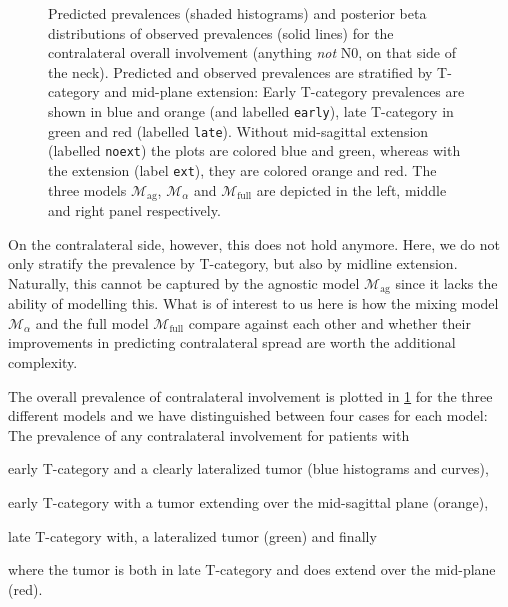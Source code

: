 \documentclass[\relativeRoot/main.tex]{subfiles}
\begin{document}
\begin{figure}
    \def\svgwidth{1.0\textwidth}
    
    \caption[
        Comparison of contralateral prevalences
    ]{
        Predicted prevalences (shaded histograms) and posterior beta distributions of observed prevalences (solid lines) for the contralateral overall involvement (anything \emph{not} N0, on that side of the neck). Predicted and observed prevalences are stratified by T-category and mid-plane extension: Early T-category prevalences are shown in blue and orange (and labelled \texttt{early}), late T-category in green and red (labelled \texttt{late}). Without mid-sagittal extension (labelled \texttt{noext}) the plots are colored blue and green, whereas with the extension (label \texttt{ext}), they are colored orange and red. The three models $\mathcal{M}_\text{ag}$, $\mathcal{M}_\alpha$ and $\mathcal{M}_\text{full}$ are depicted in the left, middle and right panel respectively.
    }
    \label{fig:bilateral:model_comp:contra}
\end{figure}

On the contralateral side, however, this does not hold anymore. Here, we do not only stratify the prevalence by T-category, but also by midline extension. Naturally, this cannot be captured by the agnostic model $\mathcal{M}_\text{ag}$ since it lacks the ability of modelling this. What is of interest to us here is how the mixing model $\mathcal{M}_\alpha$ and the full model $\mathcal{M}_\text{full}$ compare against each other and whether their improvements in predicting contralateral spread are worth the additional complexity.

The overall prevalence of contralateral involvement is plotted in \cref{fig:bilateral:model_comp:contra} for the three different models and we have distinguished between four cases for each model: The prevalence of any contralateral involvement for patients with
\begin{enumerate*}[label={(\arabic*)}]
    \item early T-category and a clearly lateralized tumor (blue histograms and curves),
    \item early T-category with a tumor extending over the mid-sagittal plane (orange),
    \item late T-category with, a lateralized tumor (green) and finally
    \item where the tumor is both in late T-category and does extend over the mid-plane (red).
\end{enumerate*}
\end{document}
